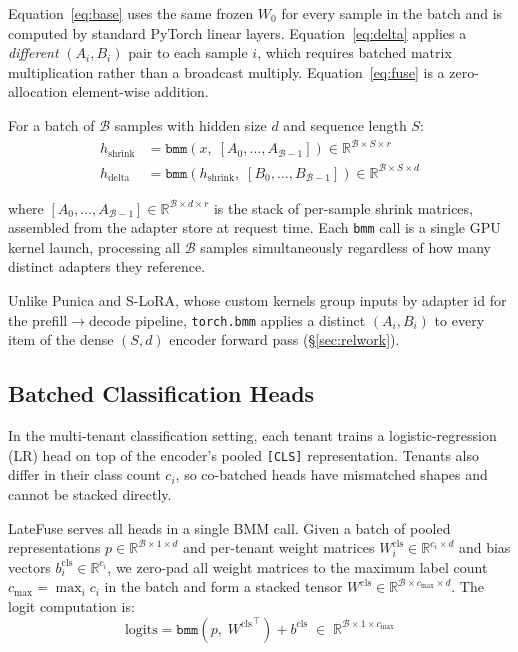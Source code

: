\documentclass[11pt]{article}
\newcommand{\sysname}{LateFuse}
\begin{document}
Equation~\ref{eq:base} uses the same frozen $W_0$ for every sample in the
batch and is computed by standard PyTorch linear layers.
Equation~\ref{eq:delta} applies a \emph{different} $(A_i, B_i)$ pair to each
sample $i$, which requires batched matrix multiplication rather than a
broadcast multiply.
Equation~\ref{eq:fuse} is a zero-allocation element-wise addition.

For a batch of $\mathcal{B}$ samples with hidden size $d$ and
sequence length $S$:
\begin{align}
  h_{\text{shrink}} &= \texttt{bmm}(x,\; [A_0,\ldots,A_{\mathcal{B}-1}])
  \in \mathbb{R}^{\mathcal{B} \times S \times r} \label{eq:shrink} \\
  h_{\text{delta}} &= \texttt{bmm}(h_{\text{shrink}},\;
  [B_0,\ldots,B_{\mathcal{B}-1}])
  \in \mathbb{R}^{\mathcal{B} \times S \times d} \label{eq:expand}
\end{align}

\noindent
where $[A_0, \ldots, A_{\mathcal{B}-1}] \in \mathbb{R}^{\mathcal{B}
\times d \times r}$ is the
stack of per-sample shrink matrices, assembled from the adapter store at
request time.
Each \texttt{bmm} call is a single GPU kernel launch, processing
all $\mathcal{B}$
samples simultaneously regardless of how many distinct adapters they reference.

Unlike Punica and S-LoRA, whose
custom kernels group inputs by adapter id for the prefill$\to$decode pipeline,
\texttt{torch.bmm} applies a distinct $(A_i, B_i)$ to every item of the dense
$(S, d)$ encoder forward pass (\S\ref{sec:relwork}).

\subsection{Batched Classification Heads}
\label{sec:lr_head}

In the multi-tenant classification setting, each tenant trains a
logistic-regression (LR) head on top of the encoder's pooled
\texttt{[CLS]} representation.
Tenants also differ in their class count $c_i$, so co-batched heads have
mismatched shapes and cannot be stacked directly.

\sysname{} serves all heads in a single BMM call.
Given a batch of pooled representations
$p \in \mathbb{R}^{\mathcal{B} \times 1 \times d}$
and per-tenant weight matrices
$W^{\text{cls}}_i \in \mathbb{R}^{c_i \times d}$ and bias vectors
$b^{\text{cls}}_i \in \mathbb{R}^{c_i}$,
we zero-pad all weight matrices to the maximum label count
$c_{\max} = \max_i c_i$ in the batch and form a stacked tensor
$W^{\text{cls}} \in \mathbb{R}^{\mathcal{B} \times c_{\max} \times d}$.
The logit computation is:
\begin{equation}
  \text{logits} = \texttt{bmm}(p,\; {W^{\text{cls}}}^\top) + b^{\text{cls}}
  \;\in\; \mathbb{R}^{\mathcal{B} \times 1 \times c_{\max}}
\end{equation}
\end{document}

